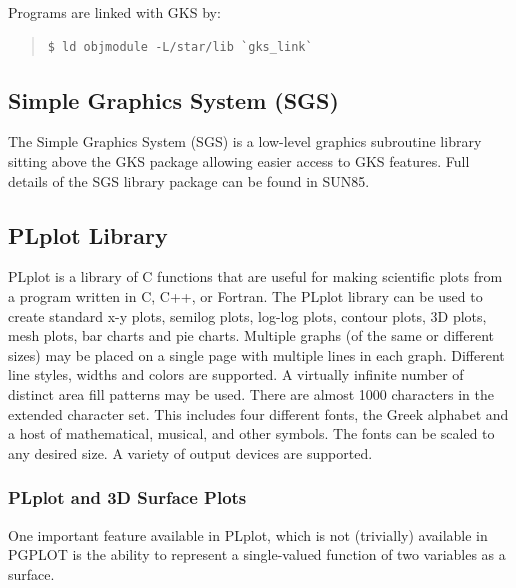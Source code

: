 \documentclass[twoside,11pt]{article}
\newcommand{\htmlref}[2]{#1}
\newcommand{\xref}[3]{#1}
\newcommand{\xlabel}[1]{}
\begin{document}
Programs are linked with GKS by: 

\small
\begin{quote}
\begin{verbatim}
$ ld objmodule -L/star/lib `gks_link` 
\end{verbatim}
\end{quote}
\normalsize

\subsection{\xlabel{sc15_sgs}Simple Graphics System (SGS)\label{sc15_sgs}}

The \xref{Simple Graphics System}{sun85}{} (SGS) is a low-level graphics subroutine library sitting above the \htmlref{GKS}{sc15_gks} package allowing easier access to GKS features. Full details of the SGS library package can be found in \xref{SUN85}{sun85}{}.

\subsection{\xlabel{sc15_plplot}PLplot Library\label{sc15_plplot}}

PLplot is a library of C functions that are useful for making scientific plots from a program written in C, C++, or Fortran. The PLplot library can be used
to create standard x-y plots, semilog plots, log-log plots, contour plots, 3D plots, mesh plots, bar charts and pie charts. Multiple graphs (of the same
or different sizes) may be placed on a single page with multiple lines in each graph. Different line styles, widths and colors are supported. A virtually
infinite number of distinct area fill patterns may be used. There are almost 1000 characters in the extended character set. This includes four different
fonts, the Greek alphabet and a host of mathematical, musical, and other symbols. The fonts can be scaled to any desired size. A variety of output
devices are supported. 

\subsubsection{PLplot and 3D Surface Plots}

One important feature available in PLplot, which is not (trivially) available in PGPLOT is the ability to represent a single-valued function of two variables as a surface. 
\end{document}
